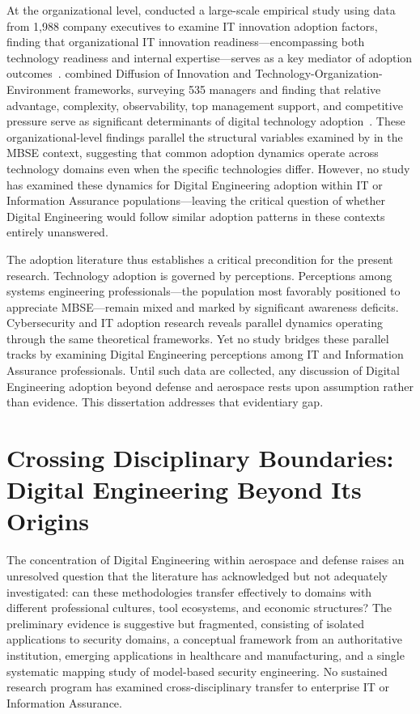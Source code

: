 At the organizational level, \citeauthor{Ali_2022} conducted a large-scale empirical study using data from 1,988 company executives to examine IT innovation adoption factors, finding that organizational IT innovation readiness---encompassing both technology readiness and internal expertise---serves as a key mediator of adoption outcomes~\parencite{Ali_2022}. \citeauthor{Shahadat_2023} combined Diffusion of Innovation and Technology-Organization-Environment frameworks, surveying 535 managers and finding that relative advantage, complexity, observability, top management support, and competitive pressure serve as significant determinants of digital technology adoption~\parencite{Shahadat_2023}. These organizational-level findings parallel the structural variables examined by \citeauthor{Henderson_Salado_2024_Org} in the MBSE context, suggesting that common adoption dynamics operate across technology domains even when the specific technologies differ. However, no study has examined these dynamics for Digital Engineering adoption within IT or Information Assurance populations---leaving the critical question of whether Digital Engineering would follow similar adoption patterns in these contexts entirely unanswered.

The adoption literature thus establishes a critical precondition for the present research. Technology adoption is governed by perceptions. Perceptions among systems engineering professionals---the population most favorably positioned to appreciate MBSE---remain mixed and marked by significant awareness deficits. Cybersecurity and IT adoption research reveals parallel dynamics operating through the same theoretical frameworks. Yet no study bridges these parallel tracks by examining Digital Engineering perceptions among IT and Information Assurance professionals. Until such data are collected, any discussion of Digital Engineering adoption beyond defense and aerospace rests upon assumption rather than evidence. This dissertation addresses that evidentiary gap.

\section{Crossing Disciplinary Boundaries: Digital Engineering Beyond Its Origins}

The concentration of Digital Engineering within aerospace and defense raises an unresolved question that the literature has acknowledged but not adequately investigated: can these methodologies transfer effectively to domains with different professional cultures, tool ecosystems, and economic structures? The preliminary evidence is suggestive but fragmented, consisting of isolated applications to security domains, a conceptual framework from an authoritative institution, emerging applications in healthcare and manufacturing, and a single systematic mapping study of model-based security engineering. No sustained research program has examined cross-disciplinary transfer to enterprise IT or Information Assurance.

